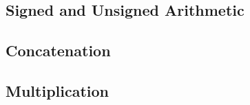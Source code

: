 \subsection{Signed and Unsigned Arithmetic}






\subsection{Concatenation}






\subsection{Multiplication}




